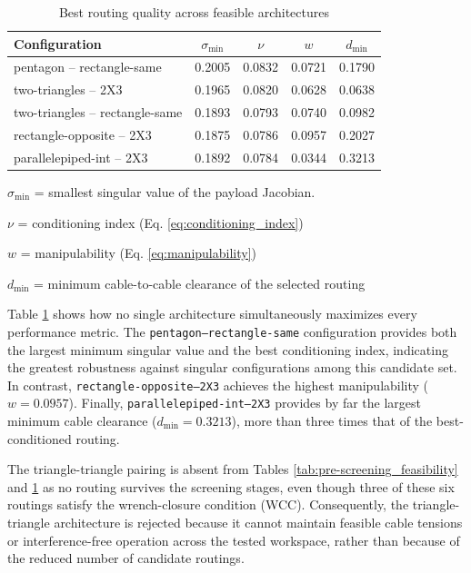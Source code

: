 \begin{table}[htbp]
\centering
\small
\begin{threeparttable}
\begin{tabular}{lcccc}
\toprule
\textbf{Configuration} & $\sigma_{\min}$ \tnote{a} & $\nu$ \tnote{b} & $w$ \tnote{c}& $d_{\min}$ \tnote{d}  \\
\midrule
pentagon -- rectangle-same          & 0.2005 & 0.0832 & 0.0721 & 0.1790 \\
two-triangles -- 2X3                & 0.1965 & 0.0820 & 0.0628 & 0.0638 \\
two-triangles -- rectangle-same     & 0.1893 & 0.0793 & 0.0740 & 0.0982 \\
rectangle-opposite -- 2X3           & 0.1875 & 0.0786 & 0.0957 & 0.2027 \\
parallelepiped-int -- 2X3           & 0.1892 & 0.0784 & 0.0344 & 0.3213 \\
\bottomrule
\end{tabular}
\caption{Best routing quality across feasible architectures}
\label{tab:pre-screening_index}
\begin{tablenotes}
\footnotesize
\item[a] $\sigma_{\min}$ = smallest singular value of the payload Jacobian.
\item[b] $\nu$ = conditioning index (Eq. \eqref{eq:conditioning_index})
\item[c] $w$ = manipulability (Eq. \eqref{eq:manipulability})
\item[d] $d_{\min}$ = minimum cable-to-cable clearance of the selected routing
\end{tablenotes}
\end{threeparttable}
\end{table}

Table \ref{tab:pre-screening_index} shows how no single architecture simultaneously maximizes every performance metric. The \texttt{pentagon--rectangle-same} configuration provides both the largest minimum singular value and the best conditioning index, indicating the greatest robustness against singular configurations among this candidate set. \\
In contrast, \texttt{rectangle-opposite--2X3} achieves the highest manipulability ($w=0.0957$). Finally, \texttt{parallelepiped-int--2X3} provides by far the largest minimum cable clearance ($d_{\min}=0.3213$), more than three times that of the best-conditioned routing.


The triangle-triangle pairing is absent from Tables \ref{tab:pre-screening_feasibility} and \ref{tab:pre-screening_index} as no routing survives the screening stages, even though three of these six routings satisfy the wrench-closure condition (WCC). Consequently, the triangle-triangle architecture is rejected because it cannot maintain feasible cable tensions or interference-free operation across the tested workspace, rather than because of the reduced number of candidate routings.

